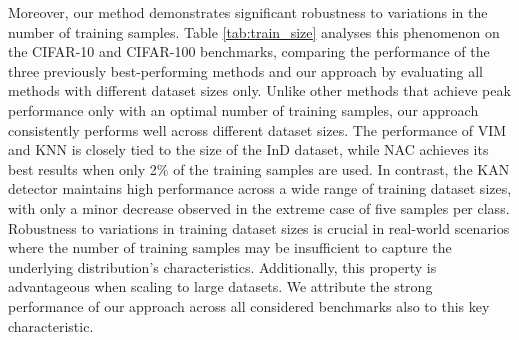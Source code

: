 Moreover, our method demonstrates significant robustness to variations in the number of training samples. 
Table \ref{tab:train_size} analyses this phenomenon on the CIFAR-10 and CIFAR-100 benchmarks, comparing the performance of the three previously best-performing methods and our approach by evaluating all methods with different dataset sizes only.
Unlike other methods that achieve peak performance only with an optimal number of training samples, our approach consistently performs well across different dataset sizes. 
The performance of VIM and KNN is closely tied to the size of the InD dataset, while NAC achieves its best results when only 2\% of the training samples are used. 
In contrast, the KAN detector maintains high performance across a wide range of training dataset sizes, with only a minor decrease observed in the extreme case of five samples per class.
Robustness to variations in training dataset sizes is crucial in real-world scenarios where the number of training samples may be insufficient to capture the underlying distribution's characteristics. 
Additionally, this property is advantageous when scaling to large datasets. 
We attribute the strong performance of our approach across all considered benchmarks also to this key characteristic.

